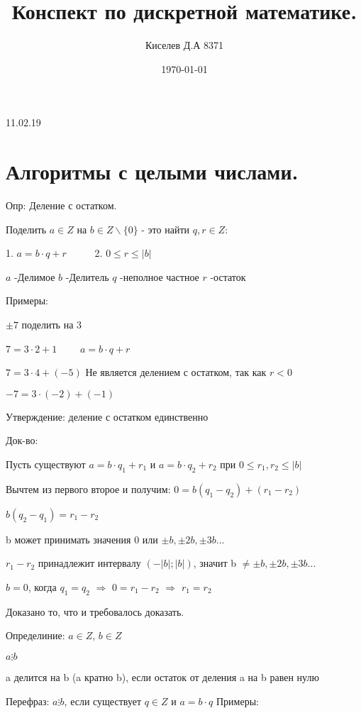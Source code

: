 \documentclass[a4paper,12pt]{article}
\author{Киселев Д.А 8371}
\title{Конспект по дискретной математике.}
\date{\today}
\begin{document}

\maketitle


11.02.19

\section{Алгоритмы с целыми числами.}

Опр: Деление с остатком.

Поделить $a \in Z$ на $b \in Z \backslash \{0\}$ - это найти $q,r\in Z:$

1. $a=b\cdot q+r$ $\hspace{30pt}$2. $0\leqslant r \leqslant |b|$

$a$ -Делимое $b$ -Делитель $q$ -неполное частное $r$ -остаток 

Примеры:

$\pm7$ поделить на $3$ 

$7=3\cdot 2+1$  $\hspace{20pt}$ $a=b\cdot q+r$

$7=3\cdot4+(-5)$ Не является делением с остатком, так как $r<0$

$-7=3\cdot(-2)+(-1)$

Утверждение: деление с остатком единственно

Док-во:

Пусть существуют 
$a=b\cdot q_1 +r_1$ и $a=b\cdot q_2 +r_2$ при $0\leqslant r_1, r_2 \leqslant |b|$

Вычтем из первого второе и получим: $0=b(q_1-q_2)+(r_1-r_2)$

$b(q_2-q_1)=r_1-r_2$

b может принимать значения 0 или $\pm b,\pm 2b, \pm 3b ...$ 

$r_1-r_2$ принадлежит интервалу $(-|b|;|b|)$, значит b $\neq \pm b,\pm 2b, \pm 3b ...$ 

$b=0$, когда $q_1=q_2$ $\Rightarrow$ $0=r_1-r_2$ $\Rightarrow$ $r_1=r_2$

Доказано то, что и требовалось доказать.

Определиние: $a\in Z$, $b\in Z$ 

$a  \vdots  b$

a делится на b (a кратно b), если остаток от деления a на b равен нулю

Перефраз: $a  \vdots  b$, если существует $q\in Z$ и $a=b\cdot q$
Примеры:
\end{document}
